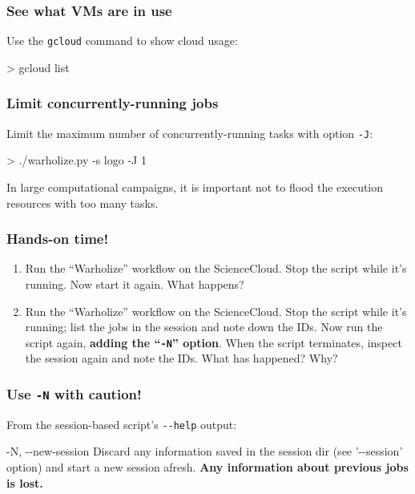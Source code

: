 \documentclass[english,serif,mathserif,usenames,dvipsnames]{beamer}
\begin{document}
\begin{frame}
  \frametitle{See what VMs are in use}

  Use the \texttt{gcloud} command to show cloud usage:
\begin{semiverbatim}
    > gcloud list
\end{semiverbatim}

\end{frame}


\begin{frame}
  \frametitle{Limit concurrently-running jobs}

  Limit the maximum number of concurrently-running tasks
  with option \texttt{-J}:
\begin{semiverbatim}
    > ./warholize.py -s logo -J 1
\end{semiverbatim}

  \+ In large computational campaigns, it is important not to flood the
  execution resources with too many tasks.
\end{frame}


\begin{frame}
  \frametitle{Hands-on time!}

    \begin{exercise}
      \begin{enumerate}
      \item Run the ``Warholize'' workflow on the ScienceCloud.  Stop
        the script while it's running.  Now start it again.  What
        happens?

      \item Run the ``Warholize'' workflow on the ScienceCloud.  Stop
        the script while it's running; list the jobs in the session
        and note down the IDs.  Now run the script again,
        \textbf{adding the ``\texttt{-N}'' option}.  When the script
        terminates, inspect the session again and note the IDs. What has
        happened? Why?
      \end{enumerate}
    \end{exercise}
\end{frame}


\begin{frame}[fragile]
  \frametitle{Use \texttt{-N} with caution!}

  \small
  From the session-based script's \texttt{-{}-help} output:
\begin{semiverbatim}
-N, -{}-new-session
  Discard any information saved in the session dir
  (see '-{}-session' option) and start a new session
  afresh. {\bf Any information about previous jobs is lost.}
\end{semiverbatim}

\end{frame}
\end{document}
